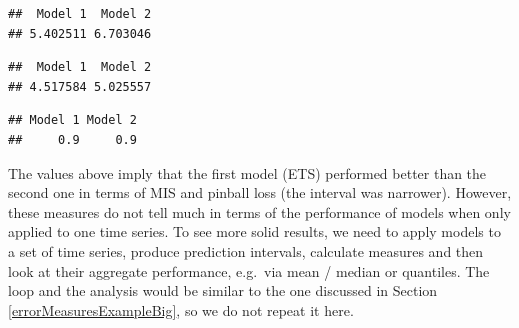 \documentclass[
]{book}
\newenvironment{Shaded}{\begin{snugshade}}{\end{snugshade}}
\newcommand{\CommentTok}[1]{\textcolor[rgb]{0.56,0.35,0.01}{\textit{#1}}}
\newcommand{\FloatTok}[1]{\textcolor[rgb]{0.00,0.00,0.81}{#1}}
\newcommand{\FunctionTok}[1]{\textcolor[rgb]{0.00,0.00,0.00}{#1}}
\newcommand{\NormalTok}[1]{#1}
\newcommand{\SpecialCharTok}[1]{\textcolor[rgb]{0.00,0.00,0.00}{#1}}
\newcommand{\StringTok}[1]{\textcolor[rgb]{0.31,0.60,0.02}{#1}}
\theoremstyle{definition}
\theoremstyle{definition}
\theoremstyle{definition}
\theoremstyle{definition}
\theoremstyle{remark}
\begin{document}
\begin{verbatim}
##  Model 1  Model 2 
## 5.402511 6.703046
\end{verbatim}

\begin{Shaded}
\end{Shaded}

\begin{verbatim}
##  Model 1  Model 2 
## 4.517584 5.025557
\end{verbatim}

\begin{Shaded}
\end{Shaded}

\begin{verbatim}
## Model 1 Model 2 
##     0.9     0.9
\end{verbatim}

The values above imply that the first model (ETS) performed better than the second one in terms of MIS and pinball loss (the interval was narrower). However, these measures do not tell much in terms of the performance of models when only applied to one time series. To see more solid results, we need to apply models to a set of time series, produce prediction intervals, calculate measures and then look at their aggregate performance, e.g.~via mean / median or quantiles. The loop and the analysis would be similar to the one discussed in Section \ref{errorMeasuresExampleBig}, so we do not repeat it here.
\end{document}
